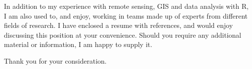 \documentclass[11pt,a4paper,sans]{moderncv}        %
\begin{document}
In addition to my experience with remote sensing, GIS and data analysis with R, I am also used to, and enjoy, working in teams made up of experts from different fields of research. I have enclosed a resume with references, and would enjoy discussing this position at your convenience. Should you require any additional material or information, I am happy to supply it.

Thank you for your consideration.

\makeletterclosing
\clearpage


\nocite{*}

   

%
%
%
%
%
%
\end{document}
